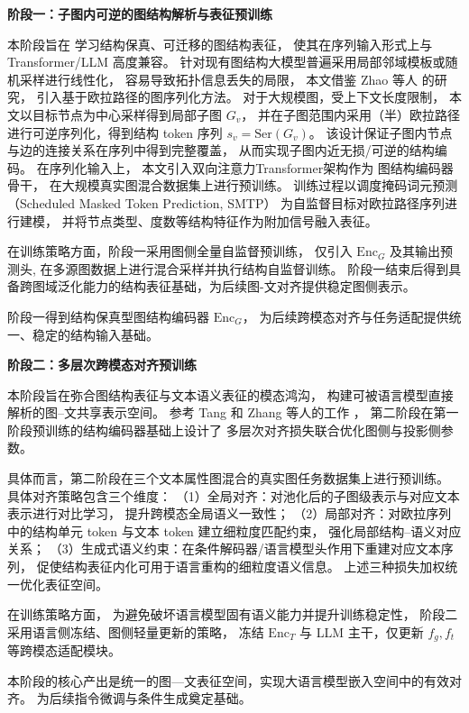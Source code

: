 \textbf{阶段一：子图内可逆的图结构解析与表征预训练}

本阶段旨在
学习结构保真、可迁移的图结构表征，
使其在序列输入形式上与 Transformer/LLM 高度兼容。
针对现有图结构大模型普遍采用局部邻域模板或随机采样进行线性化，
容易导致拓扑信息丢失的局限，
本文借鉴 Zhao 等人 \cite{Zhao2023GraphGPTGP} 的研究，
引入基于欧拉路径的图序列化方法。
对于大规模图，受上下文长度限制，
本文以目标节点为中心采样得到局部子图 $G_v$，
并在{子图范围内}采用（半）欧拉路径进行可逆序列化，得到结构 token 序列
$s_v=\mathrm{Ser}(G_v)$。
该设计保证子图内节点与边的连接关系在序列中得到完整覆盖，
从而实现{子图内近无损/可逆}的结构编码。
在序列化输入上，
本文引入双向注意力Transformer架构作为
图结构编码器骨干，
在大规模真实图混合数据集上进行预训练。
训练过程以调度掩码词元预测（Scheduled Masked Token Prediction, SMTP）
为自监督目标对欧拉路径序列进行建模，
并将节点类型、度数等结构特征作为附加信号融入表征。


在训练策略方面，阶段一采用图侧全量自监督预训练，
仅引入 $\mathrm{Enc}_G$ 及其输出预测头,
在多源图数据上进行混合采样并执行结构自监督训练。
阶段一结束后得到具备跨图域泛化能力的结构表征基础，为后续图-文对齐提供稳定图侧表示。


阶段一得到结构保真型图结构编码器 $\mathrm{Enc}_G$，
为后续跨模态对齐与任务适配提供统一、稳定的结构输入基础。

\textbf{阶段二：多层次跨模态对齐预训练}

本阶段旨在弥合图结构表征与文本语义表征的模态鸿沟，
构建可被语言模型直接解析的图--文共享表示空间。
参考 Tang 和 Zhang 等人的工作 \cite{Tang2023GraphGPTGI,Zhang2024GraphTranslatorAG}，
第二阶段在第一阶段预训练的结构编码器基础上设计了
多层次对齐损失联合优化图侧与投影侧参数。

具体而言，第二阶段在三个文本属性图混合的真实图任务数据集上进行预训练。
具体对齐策略包含三个维度：
（1）全局对齐：对池化后的子图级表示与对应文本表示进行对比学习，
    提升跨模态全局语义一致性；
（2）局部对齐：对欧拉序列中的结构单元 token 与文本 token 建立细粒度匹配约束，
    强化局部结构--语义对应关系；
（3）生成式语义约束：在条件解码器/语言模型头作用下重建对应文本序列，
    促使结构表征内化可用于语言重构的细粒度语义信息。
上述三种损失加权统一优化表征空间。

在训练策略方面，
为避免破坏语言模型固有语义能力并提升训练稳定性，
阶段二采用语言侧冻结、图侧轻量更新的策略，
冻结 $\mathrm{Enc}_T$ 与 LLM 主干，仅更新 $f_g,f_t$ 等跨模态适配模块。

本阶段的核心产出是统一的图—文表征空间，实现大语言模型嵌入空间中的有效对齐。
为后续指令微调与条件生成奠定基础。


